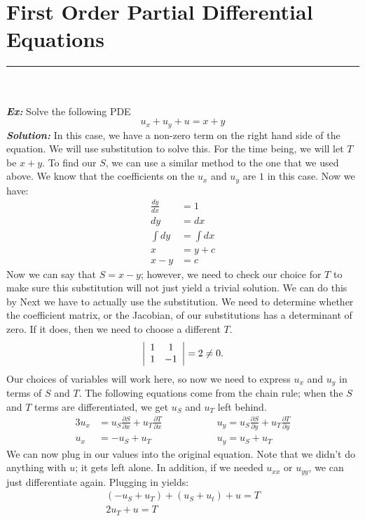 \section{First Order Partial Differential Equations}
\hrule
\noindent\\\\
\noindent\textbf{\textit{Ex:}} Solve the following PDE
\[
u_{x} + u_{y} + u = x + y
\]
\indent \textbf{\textit{Solution:}} In this case, we have a non-zero term on the
right hand side of the equation. We will use substitution to solve this. For the
time being, we will let $T$ be $x + y$. To find our $S$, we can use a similar
method to the one that we used above. We know that the coefficients on the
$u_{x}$ and $u_{y}$ are $1$ in this case. Now we have:
\begin{align*}
\frac{dy}{dx} &= 1\\
dy &= dx\\
\int dy &= \int dx\\
x &= y + c\\
x - y &= c
\end{align*}
\noindent Now we can say that $S = x - y$; however, we need to check our choice
for $T$ to make sure this substitution will not just yield a trivial solution.
We can do this by Next we have to actually use the substitution. We need to
determine whether the coefficient matrix, or the Jacobian, of our substitutions
has a determinant of zero. If it does, then we need to choose a different $T$.
\[
\left|
\begin{array}{c c}
1 & 1\\
1 & -1
\end{array}
\right| = 2 \neq 0.
\]
Our choices of variables will work here, so now we need to express $u_{x}$ and
$u_{y}$ in terms of $S$ and $T$. The following equations come from the chain
rule; when the $S$ and $T$ terms are differentiated, we get $u_{S}$ and $u_{T}$
left behind.
\begin{alignat*}{3}
u_{x} &= u_{S}\frac{\partial S}{\partial x} + u_{T}\frac{\partial T}{\partial x}
\qquad\qquad &&u_{y} = u_{S}\frac{\partial S}{\partial y} + u_{T}\frac{\partial T}{\partial y}\\
u_{x} &= -u_{S} + u_{T}  \qquad\qquad &&u_{y} = u_{S} + u_{T}
\end{alignat*}
\noindent We can now plug in our values into the original equation. Note that we
didn't do anything with $u$; it gets left alone. In addition, if we needed
$u_{xx}$ or $u_{yy}$, we can just differentiate again. Plugging in yields:
\begin{gather*}
(-u_{S} + u_{T}) + (u_{S} + u_{t}) + u = T\\
2u_{T} + u = T
\end{gather*}
